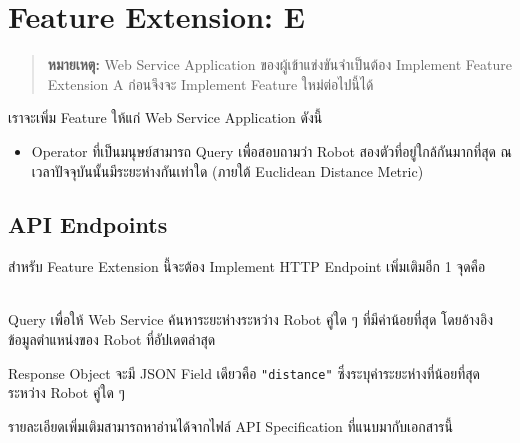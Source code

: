 
%

\section{Feature Extension: E}

\begin{quote}
  \footnotesize
  \textbf{หมายเหตุ:} Web Service Application ของผู้เข้าแข่งขันจำเป็นต้อง Implement Feature Extension A ก่อนจึงจะ Implement Feature ใหม่ต่อไปนี้ได้
\end{quote}

\noindent
เราจะเพิ่ม Feature ให้แก่ Web Service Application ดังนี้
\begin{itemize}[topsep=0pc,itemsep=0pc]
\item 
    Operator ที่เป็นมนุษย์สามารถ Query เพื่อสอบถามว่า Robot สองตัวที่อยู่ใกล้กันมากที่สุด ณ เวลาปัจจุบันนั้นมีระยะห่างกันเท่าใด (ภายใต้ Euclidean Distance Metric)
\end{itemize}

\subsection{API Endpoints}

\noindent
สำหรับ Feature Extension นี้จะต้อง Implement HTTP Endpoint เพิ่มเติมอีก 1 จุดคือ

\begin{description}[parsep=0.5pc]
\item[\npt{GET}{/closestpair}] ~ \\
    Query เพื่อให้ Web Service ค้นหาระยะห่างระหว่าง Robot คู่ใด ๆ ที่มีค่าน้อยที่สุด
    โดยอ้างอิงข้อมูลตำแหน่งของ Robot ที่อัปเดตล่าสุด

    Response Object จะมี JSON Field เดียวคือ \lstinline{"distance"} ซึ่งระบุค่าระยะห่างที่น้อยที่สุดระหว่าง Robot คู่ใด ๆ
\end{description}

\noindent        
รายละเอียดเพิ่มเติมสามารถหาอ่านได้จากไฟล์ API Specification ที่แนบมากับเอกสารนี้

